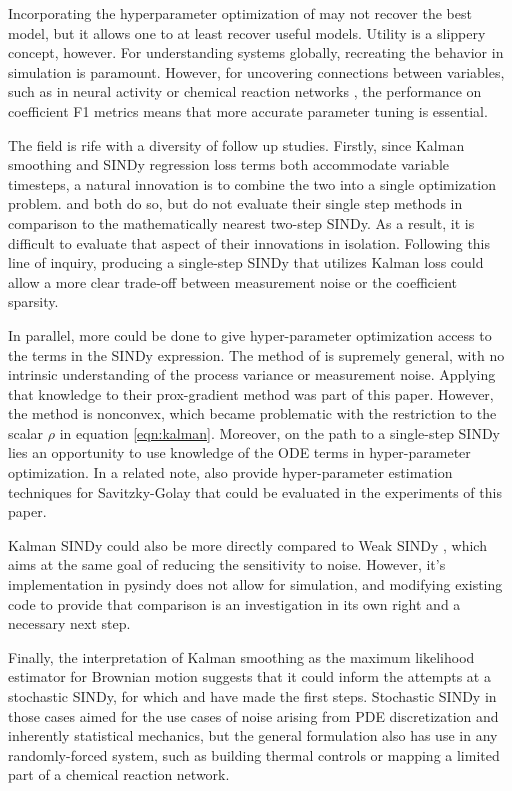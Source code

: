 \documentclass{ACCESS_latex_template_20231118/ieeeaccess}
\begin{document}
Incorporating the hyperparameter optimization of \cite{Barratt2020} may not recover the best model, but it allows one to at least recover useful models.  Utility is a slippery concept, however.  For understanding systems globally, recreating the behavior in simulation is paramount.  However, for uncovering connections between variables, such as in neural activity or chemical reaction networks \cite{Hoffmann2019}, the performance on coefficient F1 metrics means that more accurate parameter tuning is essential.

The field is rife with a diversity of follow up studies.  Firstly, since Kalman smoothing and SINDy regression loss terms both accommodate variable timesteps, a natural innovation is to combine the two into a single optimization problem.  \cite{Hirsh2022} and \cite{Rudy2019} both do so, but do not evaluate their single step methods in comparison to the mathematically nearest two-step SINDy.  As a result, it is difficult to evaluate that aspect of their innovations in isolation.
Following this line of inquiry, producing a single-step SINDy that utilizes Kalman loss could allow a more clear trade-off between measurement noise or the coefficient sparsity.

In parallel, more could be done to give hyper-parameter optimization  access to the terms in the SINDy expression.  The method of \cite{Barratt2020} is supremely general, with no intrinsic understanding of the process variance or measurement noise.  Applying that knowledge to their prox-gradient method was part of this paper.  However, the method is nonconvex, which became problematic with the restriction to the scalar $\rho$ in equation \ref{eqn:kalman}.  Moreover, on the path to a single-step SINDy lies an opportunity to use knowledge of the ODE terms in hyper-parameter optimization.  In a related note, \cite{VanBreugel2020} also provide hyper-parameter estimation techniques for Savitzky-Golay that could be evaluated in the experiments of this paper.

Kalman SINDy could also be more directly compared to Weak SINDy \citep{messenger2021bweak}, which aims at the same goal of reducing the sensitivity to noise.  However, it's implementation in pysindy does not allow for simulation, and modifying existing code to provide that comparison is an investigation in its own right and a necessary next step.

Finally, the interpretation of Kalman smoothing as the maximum likelihood estimator for Brownian motion suggests that it could inform the attempts at a stochastic SINDy, for which \cite{Callaham2021} and \cite{Boninsegna2018} have made the first steps.  Stochastic SINDy in those cases aimed for the use cases of noise arising from PDE discretization and inherently statistical mechanics, but the general formulation also has use in any randomly-forced system, such as building thermal controls or mapping a limited part of a chemical reaction network.
\end{document}

